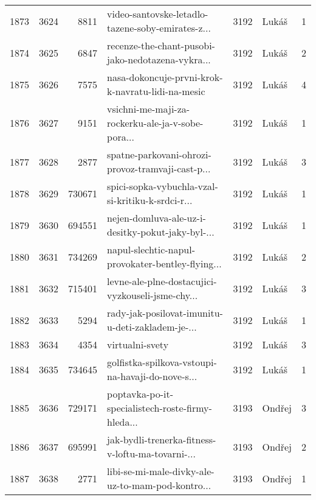 \begin{tabular}{lrrlrlr}
1873 &       3624 &     8811 &  video-santovske-letadlo-tazene-soby-emirates-z... &     3192 &                        Lukáš &               1 \\
1874 &       3625 &     6847 &  recenze-the-chant-pusobi-jako-nedotazena-vykra... &     3192 &                        Lukáš &               2 \\
1875 &       3626 &     7575 &  nasa-dokoncuje-prvni-krok-k-navratu-lidi-na-mesic &     3192 &                        Lukáš &               4 \\
1876 &       3627 &     9151 &  vsichni-me-maji-za-rockerku-ale-ja-v-sobe-pora... &     3192 &                        Lukáš &               1 \\
1877 &       3628 &     2877 &  spatne-parkovani-ohrozi-provoz-tramvaji-cast-p... &     3192 &                        Lukáš &               3 \\
1878 &       3629 &   730671 &  spici-sopka-vybuchla-vzal-si-kritiku-k-srdci-r... &     3192 &                        Lukáš &               1 \\
1879 &       3630 &   694551 &  nejen-domluva-ale-uz-i-desitky-pokut-jaky-byl-... &     3192 &                        Lukáš &               1 \\
1880 &       3631 &   734269 &  napul-slechtic-napul-provokater-bentley-flying... &     3192 &                        Lukáš &               2 \\
1881 &       3632 &   715401 &  levne-ale-plne-dostacujici-vyzkouseli-jsme-chy... &     3192 &                        Lukáš &               3 \\
1882 &       3633 &     5294 &  rady-jak-posilovat-imunitu-u-deti-zakladem-je-... &     3192 &                        Lukáš &               1 \\
1883 &       3634 &     4354 &                                    virtualni-svety &     3192 &                        Lukáš &               3 \\
1884 &       3635 &   734645 &  golfistka-spilkova-vstoupi-na-havaji-do-nove-s... &     3192 &                        Lukáš &               1 \\
1885 &       3636 &   729171 &  poptavka-po-it-specialistech-roste-firmy-hleda... &     3193 &                       Ondřej &               3 \\
1886 &       3637 &   695991 &  jak-bydli-trenerka-fitness-v-loftu-ma-tovarni-... &     3193 &                       Ondřej &               2 \\
1887 &       3638 &     2771 &  libi-se-mi-male-divky-ale-uz-to-mam-pod-kontro... &     3193 &                       Ondřej &               1 \\

\end{tabular}
